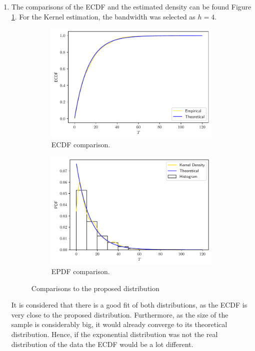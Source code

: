 \documentclass[fleqn]{article}
\begin{document}
\begin{enumerate}[label=\alph*)]
  \item The comparisons of the ECDF and the estimated density can be found
    Figure \ref{fig:comp}. For the Kernel estimation, the bandwidth was selected
    as $h = 4$.
    \begin{figure}[H]
      \centering
      \begin{subfigure}[b]{0.4\textwidth}
        \centering
        \includegraphics[scale=.5]{../figs/ecdf-vs-theo}
        \caption{ECDF comparison.}
      \end{subfigure}
      \begin{subfigure}[b]{0.4\textwidth}
        \centering \includegraphics[scale=0.5]{../figs/pdf-vs-theo}
        \caption{EPDF comparison.}
      \end{subfigure}
      \caption{Comparisons to the proposed distribution}
      \label{fig:comp}
    \end{figure}
    It is considered that there is a good fit of both distributions, as the ECDF
    is very close to the proposed distribution. Furthermore, as the size of the
    sample is considerably big, it would already converge to its theoretical
    distribution. Hence, if the exponential distribution was not the real
    distribution of the data the ECDF would be a lot different.


\end{enumerate}
\end{document}
